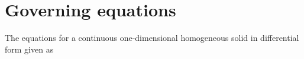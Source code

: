 \documentclass{article}
\theoremstyle{plain}\newtheorem{definition}{\sc{Definition}}
\theoremstyle{defination}\newtheorem{example}{Example}[section]
\numberwithin{equation}{section}
\numberwithin{table}{section}
\begin{document}
%
%
%
%

\section{Governing equations} 

The equations for a continuous one-dimensional homogeneous solid in differential form given as
\end{document}
